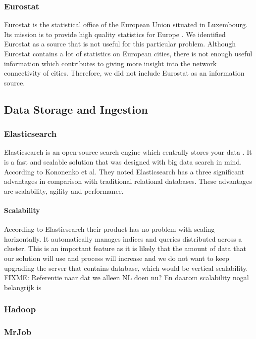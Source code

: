 \subsubsection{Eurostat}
Eurostat is the statistical office of the European Union situated in Luxembourg. Its mission is to provide high quality statistics for Europe \cite{Eurostat}. We identified Eurostat as a source that is not useful for this particular problem. Although Eurostat contains a lot of statistics on European cities, there is not enough useful information which contributes to giving more insight into the network connectivity of cities. Therefore, we did not include Eurostat as an information source.

\subsection{Data Storage and Ingestion}
\subsubsection{Elasticsearch}
Elasticsearch is an open-source search engine which centrally stores your data \cite{Elasticsearch}. It is a fast and scalable solution that was designed with big data search in mind. According to Kononenko et al. \cite{Kononenko2014} They noted Elasticsearch has a three significant advantages in comparison with traditional relational databases. These advantages are scalability, agility and performance. \\
\paragraph{Scalability} According to Elasticsearch \cite{Elasticsearch} their product has no problem with scaling horizontally. It automatically manages indices and queries distributed across a cluster. This is an important feature as it is likely that the amount of data that our solution will use and process will increase and we do not want to keep upgrading the server that contains database, which would be vertical scalability. {\color{Red} FIXME: Referentie naar dat we alleen NL doen nu? En daarom scalability nogal belangrijk is}
\subsubsection{Hadoop}
\subsubsection{MrJob}


